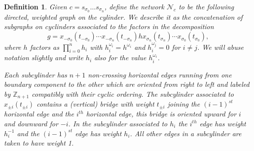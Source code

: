 \documentclass[12pt]{amsart}
\newcommand{\ZZ}{\mathbb{Z}}
\newcommand{\net}{\mathcal{N}} %
\newtheorem{definition}[theorem]{Definition}
\numberwithin{equation}{section}
\begin{document}
\begin{definition}
Given $c = s_{\sigma_0} \dotsc s_{\sigma_n}$, define the \emph{network} $\net_c$ to be the following directed, weighted graph on the cylinder. We describe it as the concatenation of subgraphs on cyclinders associated to the factors in the decomposition 
\[g=x_{-\sigma_0}(t_{-\sigma_0})\cdots x_{-\sigma_n}(t_{-\sigma_n}) hx_{\sigma_n}(t_{\sigma_n}) \cdots x_{\sigma_0}(t_{\sigma_0}),\]
where $h$ factors as $\prod\limits_{i=0}^n h_i$ with $h_i^{\omega_i}=h^{\omega_i}$ and $h_i^{\omega_j}=0$ for $i\ne j$.  We will abuse notation slightly and write $h_i$ also for the value $h_i^{\omega_i}$.

Each subcylinder has $n+1$ non-crossing \emph{horizontal} edges running from one boundary component to the other which are oriented from right to left and labeled by $\ZZ_{n+1}$ compatibly with their cyclic ordering.  The subcylinder associated to $x_{\pm i}(t_{\pm i})$ contains a (\emph{vertical}) \emph{bridge} with weight $t_{\pm i}$ joining the $(i-1)^{st}$ horizontal edge and the $i^{th}$ horizontal edge, this bridge is oriented upward for $i$ and downward for $-i$.  In the subcylinder associated to $h_i$ the $i^{th}$ edge has weight $h_i^{-1}$ and the $(i-1)^{st}$ edge has weight $h_i$.  All other edges in a subcylinder are taken to have weight 1.


\end{definition}
\end{document}
